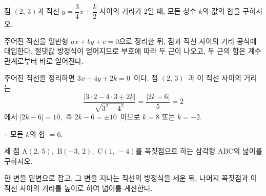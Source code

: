 \documentclass[10pt]{article}
\begin{document}
\newpage


\begin{dmproblem}
점 $(2,\, 3)$과 직선 $y = \dfrac{3}{4}x + \dfrac{k}{2}$ 사이의 거리가 $2$일 때, 모든 상수 $k$의 값의 합을 구하시오.
\end{dmproblem}

\begin{dmapproach}
주어진 직선을 일반형 $ax + by + c = 0$으로 정리한 뒤, 점과 직선 사이의 거리 공식에 대입한다. 절댓값 방정식이 얻어지므로 부호에 따라 두 근이 나오고, 두 근의 합은 계수 관계로부터 바로 얻어진다.
\end{dmapproach}

\begin{dmsolution}
주어진 직선을 정리하면 $3x - 4y + 2k = 0$\ 이다. 점 $(2,\, 3)$\ 과 이 직선 사이의 거리는
\begin{equation*}
  \frac{|3 \cdot 2 - 4 \cdot 3 + 2k|}{\sqrt{3^2 + 4^2}} = \frac{|2k - 6|}{5} = 2
\end{equation*}
에서 $|2k - 6| = 10$,\ 즉 $2k - 6 = \pm 10$\ 이므로 $k = 8$ 또는 $k = -2$.

$\therefore$ 모든 $k$의 합 $= 6$.
\end{dmsolution}

\dmchecktitle



\newpage


\begin{dmproblem}
세 점 $\mathrm{A}(2,\, 5)$,\ $\mathrm{B}(-3,\, 2)$,\ $\mathrm{C}(1,\, -4)$를 꼭짓점으로 하는 삼각형 $\mathrm{ABC}$의 넓이를 구하시오.
\end{dmproblem}

\begin{dmapproach}
한 변을 밑변으로 잡고, 그 변을 지나는 직선의 방정식을 세운 뒤, 나머지 꼭짓점과 이 직선 사이의 거리를 높이로 하여 넓이를 계산한다.
\end{dmapproach}
\end{document}
